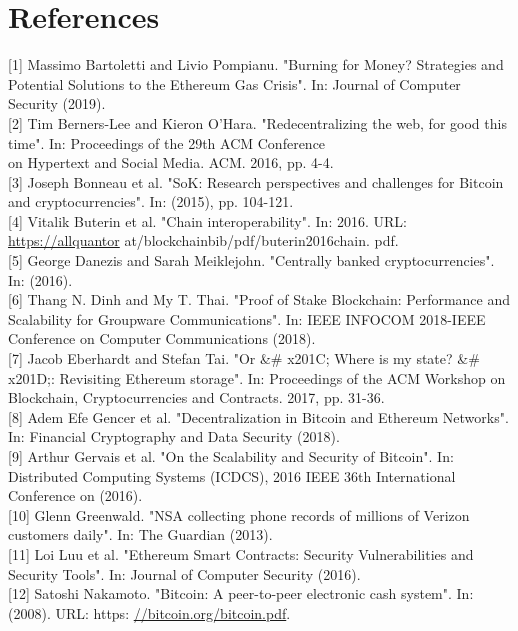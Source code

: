 \documentclass[10pt]{article}
\begin{document}
\section*{References}
[1] Massimo Bartoletti and Livio Pompianu. "Burning for Money? Strategies and Potential Solutions to the Ethereum Gas Crisis". In: Journal of Computer Security (2019).\\[0pt]
[2] Tim Berners-Lee and Kieron O'Hara. "Redecentralizing the web, for good this time". In: Proceedings of the 29th ACM Conference\\
on Hypertext and Social Media. ACM. 2016, pp. 4-4.\\[0pt]
[3] Joseph Bonneau et al. "SoK: Research perspectives and challenges for Bitcoin and cryptocurrencies". In: (2015), pp. 104-121.\\[0pt]
[4] Vitalik Buterin et al. "Chain interoperability". In: 2016. URL: \href{https://allquantor}{https://allquantor} at/blockchainbib/pdf/buterin2016chain. pdf.\\[0pt]
[5] George Danezis and Sarah Meiklejohn. "Centrally banked cryptocurrencies". In: (2016).\\[0pt]
[6] Thang N. Dinh and My T. Thai. "Proof of Stake Blockchain: Performance and Scalability for Groupware Communications". In: IEEE INFOCOM 2018-IEEE Conference on Computer Communications (2018).\\[0pt]
[7] Jacob Eberhardt and Stefan Tai. "Or \&\# x201C; Where is my state? \&\# x201D;: Revisiting Ethereum storage". In: Proceedings of the ACM Workshop on Blockchain, Cryptocurrencies and Contracts. 2017, pp. 31-36.\\[0pt]
[8] Adem Efe Gencer et al. "Decentralization in Bitcoin and Ethereum Networks". In: Financial Cryptography and Data Security (2018).\\[0pt]
[9] Arthur Gervais et al. "On the Scalability and Security of Bitcoin". In: Distributed Computing Systems (ICDCS), 2016 IEEE 36th International Conference on (2016).\\[0pt]
[10] Glenn Greenwald. "NSA collecting phone records of millions of Verizon customers daily". In: The Guardian (2013).\\[0pt]
[11] Loi Luu et al. "Ethereum Smart Contracts: Security Vulnerabilities and Security Tools". In: Journal of Computer Security (2016).\\[0pt]
[12] Satoshi Nakamoto. "Bitcoin: A peer-to-peer electronic cash system". In: (2008). URL: https: \href{//bitcoin.org/bitcoin.pdf}{//bitcoin.org/bitcoin.pdf}.\\[0pt]
\end{document}
